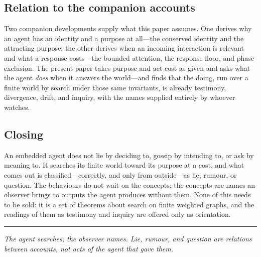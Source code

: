 \documentclass[11pt,twocolumn,a4paper]{article}
\begin{document}
\subsection{Relation to the companion accounts}

Two companion developments supply what this paper assumes. One derives why an
agent has an identity and a purpose at all---the conserved identity and the
attracting purpose; the other derives when an incoming interaction is
relevant and what a response costs---the bounded attention, the response
floor, and phase exclusion. The present paper takes purpose and act-cost as
given and asks what the agent \emph{does} when it answers the world---and
finds that the doing, run over a finite world by search under those same
invariants, is already testimony, divergence, drift, and inquiry, with the
names supplied entirely by whoever watches.

\subsection{Closing}

An embedded agent does not lie by deciding to, gossip by intending to, or ask
by meaning to. It searches its finite world toward its purpose at a cost, and
what comes out is classified---correctly, and only from outside---as lie,
rumour, or question. The behaviours do not wait on the concepts; the concepts
are names an observer brings to outputs the agent produces without them. None
of this needs to be sold: it is a set of theorems about search on finite
weighted graphs, and the readings of them as testimony and inquiry are
offered only as orientation.

\vspace{0.6em}
\hrule
\vspace{0.4em}
\noindent\emph{The agent searches; the observer names. Lie, rumour, and
question are relations between accounts, not acts of the agent that gave
them.}



\end{document}

